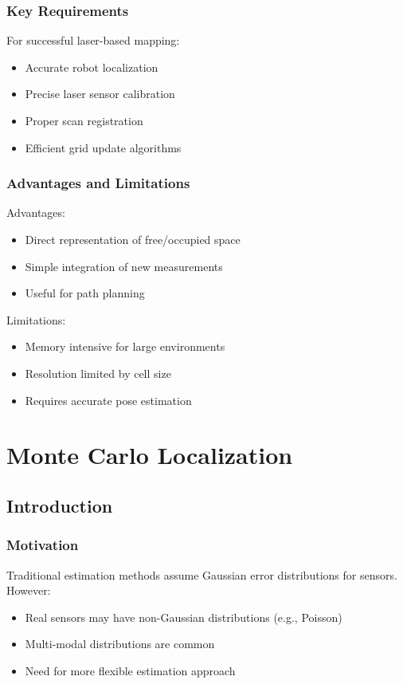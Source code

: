 \documentclass[openany]{book}
\theoremstyle{definition}
\theoremstyle{remark}
\begin{document}
\subsection{Key Requirements}
For successful laser-based mapping:
\begin{itemize}
   \item Accurate robot localization
   \item Precise laser sensor calibration
   \item Proper scan registration
   \item Efficient grid update algorithms
\end{itemize}

\subsection{Advantages and Limitations}
Advantages:
\begin{itemize}
   \item Direct representation of free/occupied space
   \item Simple integration of new measurements
   \item Useful for path planning
\end{itemize}

Limitations:
\begin{itemize}
   \item Memory intensive for large environments
   \item Resolution limited by cell size
   \item Requires accurate pose estimation
\end{itemize}

\chapter{Monte Carlo Localization}

\section{Introduction}

\subsection{Motivation}
Traditional estimation methods assume Gaussian error distributions for sensors. However:
\begin{itemize}
   \item Real sensors may have non-Gaussian distributions (e.g., Poisson)
   \item Multi-modal distributions are common
   \item Need for more flexible estimation approach
\end{itemize}
\end{document}
